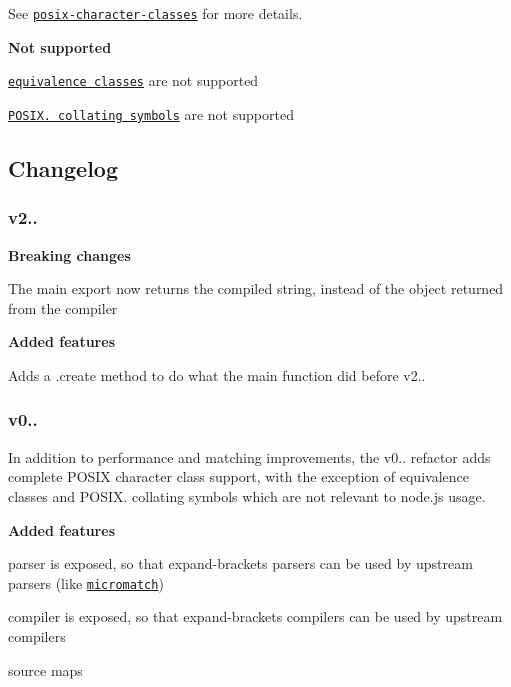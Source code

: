 See \href{https://github.com/jonschlinkert/posix-character-classes}{\tt posix-\/character-\/classes} for more details.

{\bfseries Not supported}


\begin{DoxyItemize}
\item \href{https://www.gnu.org/software/gawk/manual/html_node/Bracket-Expressions.html}{\tt equivalence classes} are not supported
\item \href{https://www.gnu.org/software/gawk/manual/html_node/Bracket-Expressions.html}{\tt P\+O\+S\+I\+X. collating symbols} are not supported
\end{DoxyItemize}

\subsection*{Changelog}

\subsubsection*{v2..}

{\bfseries Breaking changes}


\begin{DoxyItemize}
\item The main export now returns the compiled string, instead of the object returned from the compiler
\end{DoxyItemize}

{\bfseries Added features}


\begin{DoxyItemize}
\item Adds a {\ttfamily .create} method to do what the main function did before v2..
\end{DoxyItemize}

\subsubsection*{v0..}

In addition to performance and matching improvements, the v0.. refactor adds complete P\+O\+S\+IX character class support, with the exception of equivalence classes and P\+O\+S\+I\+X. collating symbols which are not relevant to node.\+js usage.

{\bfseries Added features}


\begin{DoxyItemize}
\item parser is exposed, so that expand-\/brackets parsers can be used by upstream parsers (like \href{https://github.com/jonschlinkert/micromatch}{\tt micromatch})
\item compiler is exposed, so that expand-\/brackets compilers can be used by upstream compilers
\item source maps
\end{DoxyItemize}

